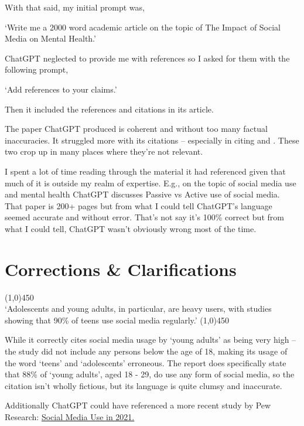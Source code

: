 \documentclass[12pt]{article}
\begin{document}
With that said, my initial prompt was,
\begin{center}
    `Write me a 2000 word academic article on the topic of The Impact of Social Media on Mental Health.'
\end{center}
ChatGPT neglected to provide me with references so I asked for them with the following prompt,
\begin{center}
    `Add references to your claims.'
\end{center}
Then it included the references and citations in its article.

The paper ChatGPT produced is coherent and without too many factual inaccuracies. It struggled more with its citations -- especially in citing \cite{smith2018} and \cite{statista2023}. These two crop up in many places where they're not relevant. 

I spent a lot of time reading through the material it had referenced given that much of it is outside my realm of expertise. E.g., on the topic of social media use and mental health ChatGPT discusses Passive vs Active use of social media. That paper is 200+ pages but from what I could tell ChatGPT's language seemed accurate and without error. That's not say it's 100\% correct but from what I could tell, ChatGPT wasn't obviously wrong most of the time.

\section{Corrections \& Clarifications}

\begin{center}
    \line(1,0){450}\\
    `Adolescents and young adults, in particular, are heavy users, with studies showing that 90\% of teens use social media regularly.\cite{smith2018}'
    \line(1,0){450}
\end{center}
While it correctly cites social media usage by `young adults' as being very high -- the study did not include any persons below the age of 18, making its usage of the word `teens' and `adolescents' erroneous. The report does specifically state that 88\% of `young adults', aged 18 - 29, do use any form of social media, so the citation isn't wholly fictious, but its language is quite clumsy and inaccurate.

Additionally ChatGPT could have referenced a more recent study by Pew Research: \href{https://www.pewresearch.org/internet/2021/04/07/social-media-use-in-2021/}{Social Media Use in 2021.}
\end{document}
